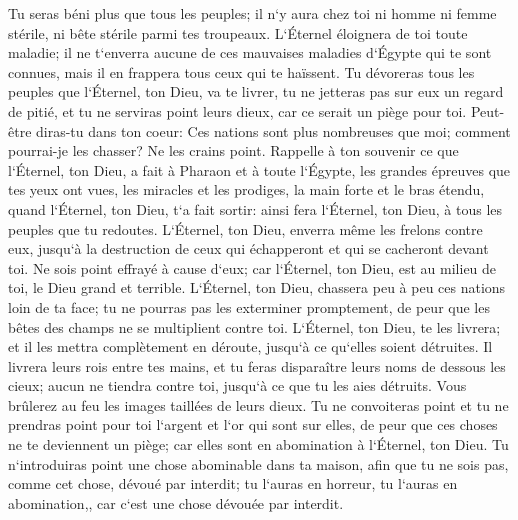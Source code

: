 \verse Tu seras béni plus que tous les peuples; il n`y aura chez toi ni homme ni femme stérile, ni bête stérile parmi tes troupeaux. 
\verse L`Éternel éloignera de toi toute maladie; il ne t`enverra aucune de ces mauvaises maladies d`Égypte qui te sont connues, mais il en frappera tous ceux qui te haïssent. 
\verse Tu dévoreras tous les peuples que l`Éternel, ton Dieu, va te livrer, tu ne jetteras pas sur eux un regard de pitié, et tu ne serviras point leurs dieux, car ce serait un piège pour toi. 
\verse Peut-être diras-tu dans ton coeur: Ces nations sont plus nombreuses que moi; comment pourrai-je les chasser? 
\verse Ne les crains point. Rappelle à ton souvenir ce que l`Éternel, ton Dieu, a fait à Pharaon et à toute l`Égypte, 
\verse les grandes épreuves que tes yeux ont vues, les miracles et les prodiges, la main forte et le bras étendu, quand l`Éternel, ton Dieu, t`a fait sortir: ainsi fera l`Éternel, ton Dieu, à tous les peuples que tu redoutes. 
\verse L`Éternel, ton Dieu, enverra même les frelons contre eux, jusqu`à la destruction de ceux qui échapperont et qui se cacheront devant toi. 
\verse Ne sois point effrayé à cause d`eux; car l`Éternel, ton Dieu, est au milieu de toi, le Dieu grand et terrible. 
\verse L`Éternel, ton Dieu, chassera peu à peu ces nations loin de ta face; tu ne pourras pas les exterminer promptement, de peur que les bêtes des champs ne se multiplient contre toi. 
\verse L`Éternel, ton Dieu, te les livrera; et il les mettra complètement en déroute, jusqu`à ce qu`elles soient détruites. 
\verse Il livrera leurs rois entre tes mains, et tu feras disparaître leurs noms de dessous les cieux; aucun ne tiendra contre toi, jusqu`à ce que tu les aies détruits. 
\verse Vous brûlerez au feu les images taillées de leurs dieux. Tu ne convoiteras point et tu ne prendras point pour toi l`argent et l`or qui sont sur elles, de peur que ces choses ne te deviennent un piège; car elles sont en abomination à l`Éternel, ton Dieu. 
\verse Tu n`introduiras point une chose abominable dans ta maison, afin que tu ne sois pas, comme cet chose, dévoué par interdit; tu l`auras en horreur, tu l`auras en abomination,, car c`est une chose dévouée par interdit. 


